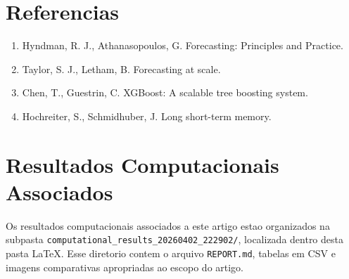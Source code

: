 \documentclass[12pt]{article}
\providecommand{\tightlist}{%
  \setlength{\itemsep}{0pt}\setlength{\parskip}{0pt}}
\begin{document}
\section{Referencias}\label{referencias}

\begin{enumerate}
\def\labelenumi{\arabic{enumi}.}
\tightlist
\item
  Hyndman, R. J., Athanasopoulos, G. Forecasting: Principles and Practice.
\item
  Taylor, S. J., Letham, B. Forecasting at scale.
\item
  Chen, T., Guestrin, C. XGBoost: A scalable tree boosting system.
\item
  Hochreiter, S., Schmidhuber, J. Long short-term memory.
\end{enumerate}

\section*{Resultados Computacionais Associados}

Os resultados computacionais associados a este artigo estao organizados na subpasta \texttt{computational\_results\_20260402\_222902/}, localizada dentro desta pasta \LaTeX. Esse diretorio contem o arquivo \texttt{REPORT.md}, tabelas em CSV e imagens comparativas apropriadas ao escopo do artigo.
\end{document}
